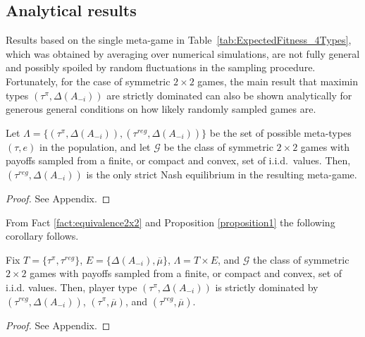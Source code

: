 \documentclass[fleqn,reqno,11pt]{article}
\begin{document}
\subsection{Analytical results}
\label{sec:analytical-results}

Results based on the single meta-game in Table~\ref{tab:ExpectedFitness_4Types}, which was
obtained by averaging over numerical simulations, are not fully general and possibly spoiled by
random fluctuations in the sampling procedure. Fortunately, for the case of symmetric
$2 \times 2$ games, the main result that maximin types $(\tau^{\pi}, \Delta(A_{-i}))$ are
strictly dominated can also be shown analytically for generous general conditions on how likely
randomly sampled games are.

\begin{proposition} \label{proposition1}

  Let $\Lambda = \lbrace (\tau^{\pi}, \Delta(A_{-i})), (\tau^{reg}, \Delta(A_{-i})) \rbrace$ be
  the set of possible meta-types $(\tau, e)$ in the population, and let $\mathcal{G}$ be the class
  of symmetric $2 \times 2$ games with payoffs sampled from a finite, or compact and convex,
  set of i.i.d.~values. Then, $(\tau^{reg}, \Delta(A_{-i}))$ is the only strict Nash
  equilibrium in the resulting meta-game.

\end{proposition}

\begin{proof}
See Appendix.
\end{proof}

From Fact \ref{fact:equivalence2x2} and Proposition \ref{proposition1} the following corollary follows.

\begin{corollary} \label{corollary1}

  Fix $T = \lbrace \tau^{\pi}, \tau^{reg} \rbrace$,
  $E = \lbrace \Delta(A_{-i}), \overline{\mu} \rbrace$, $\Lambda= T \times E$, and
  $\mathcal{G}$ the class of symmetric $2 \times 2$ games with payoffs sampled from a finite,
  or compact and convex, set of i.i.d. values. Then, player type $(\tau^{\pi}, \Delta(A_{-i}))$
  is strictly dominated by $(\tau^{reg}, \Delta(A_{-i}))$, $(\tau^{\pi}, \overline{\mu})$, and
  $(\tau^{reg}, \overline{\mu})$.

\end{corollary}

\begin{proof}
See Appendix.
\end{proof}
\end{document}
